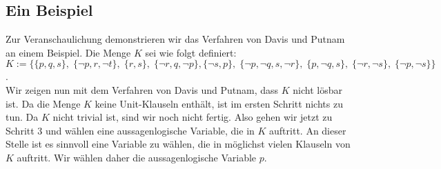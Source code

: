 \subsection{Ein Beispiel}
Zur Veranschaulichung demonstrieren wir das Verfahren von Davis und Putnam an einem Beispiel.
Die Menge $K$ sei wie folgt definiert: \\[0.2cm]
\hspace*{-0.3cm}
 $K := \Big\{ \{p, q, s\},\; \{\neg p, r, \neg t\},\;  \{r, s\},\; \{\neg r, q, \neg p\}, 
               \{\neg s, p\},\; \{\neg p, \neg q, s, \neg r\},\; \{p, \neg q, s\},\; \{\neg r, \neg s\},\;
             \{\neg p, \neg s\} 
        \Big\}$. 
\\[0.2cm]
Wir zeigen nun mit dem Verfahren von Davis und Putnam, dass $K$ nicht lösbar ist.  Da die
Menge $K$ keine Unit-Klauseln enthält, ist im ersten Schritt nichts zu tun.  Da $K$ nicht
trivial ist, sind wir noch nicht fertig.  Also gehen wir jetzt zu Schritt 3 und wählen
eine aussagenlogische Variable, die in $K$ auftritt.  An dieser Stelle ist es sinnvoll
eine Variable zu wählen, die in möglichst vielen Klauseln von $K$ auftritt.  Wir wählen
daher die aussagenlogische Variable $p$.
